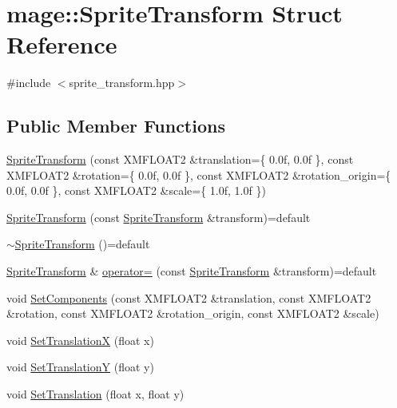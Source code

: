 \hypertarget{structmage_1_1_sprite_transform}{}\section{mage\+:\+:Sprite\+Transform Struct Reference}
\label{structmage_1_1_sprite_transform}


{\ttfamily \#include $<$sprite\+\_\+transform.\+hpp$>$}

\subsection*{Public Member Functions}
\begin{DoxyCompactItemize}
\item 
\hyperlink{structmage_1_1_sprite_transform_a191b7c98833792fcdb467ba13ccce1c9}{Sprite\+Transform} (const X\+M\+F\+L\+O\+A\+T2 \&translation=\{ 0.\+0f, 0.\+0f \}, const X\+M\+F\+L\+O\+A\+T2 \&rotation=\{ 0.\+0f, 0.\+0f \}, const X\+M\+F\+L\+O\+A\+T2 \&rotation\+\_\+origin=\{ 0.\+0f, 0.\+0f \}, const X\+M\+F\+L\+O\+A\+T2 \&scale=\{ 1.\+0f, 1.\+0f \})
\item 
\hyperlink{structmage_1_1_sprite_transform_a0126a3f6c7f486f10ec5d5ffd1180698}{Sprite\+Transform} (const \hyperlink{structmage_1_1_sprite_transform}{Sprite\+Transform} \&transform)=default
\item 
\hyperlink{structmage_1_1_sprite_transform_a14a3614023996cbb071c3de99f9528bc}{$\sim$\+Sprite\+Transform} ()=default
\item 
\hyperlink{structmage_1_1_sprite_transform}{Sprite\+Transform} \& \hyperlink{structmage_1_1_sprite_transform_af0adccff92d48e7b347e66277981ee07}{operator=} (const \hyperlink{structmage_1_1_sprite_transform}{Sprite\+Transform} \&transform)=default
\item 
void \hyperlink{structmage_1_1_sprite_transform_a53ced8d0f04db44bca1b218ea25b46e5}{Set\+Components} (const X\+M\+F\+L\+O\+A\+T2 \&translation, const X\+M\+F\+L\+O\+A\+T2 \&rotation, const X\+M\+F\+L\+O\+A\+T2 \&rotation\+\_\+origin, const X\+M\+F\+L\+O\+A\+T2 \&scale)
\item 
void \hyperlink{structmage_1_1_sprite_transform_a59f5300f046b73c958084977158ed789}{Set\+TranslationX} (float x)
\item 
void \hyperlink{structmage_1_1_sprite_transform_a52a07a3c3d9f65a33bc658208cd40444}{Set\+TranslationY} (float y)
\item 
void \hyperlink{structmage_1_1_sprite_transform_aa8e838691b090b12ed275aeb61413d80}{Set\+Translation} (float x, float y)

\end{DoxyCompactItemize}
